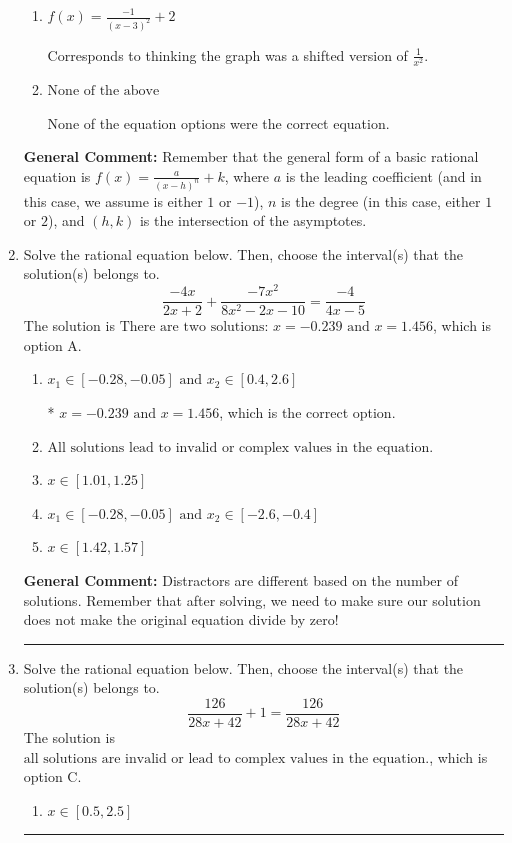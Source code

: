 \documentclass{extbook}[14pt]
\newcommand{\litem}[1]{\item #1

\rule{\textwidth}{0.4pt}}
\begin{document}
\begin{enumerate}
{\begin{enumerate}[label=\Alph*.]
Corresponds to using the general form $f(x) = \frac{a}{x-h}+k$ and the opposite leading coefficient.
\item \( f(x) = \frac{-1}{(x - 3)^2} + 2 \)

Corresponds to thinking the graph was a shifted version of $\frac{1}{x^2}$.
\item \( \text{None of the above} \)

None of the equation options were the correct equation.
\end{enumerate}

\textbf{General Comment:} Remember that the general form of a basic rational equation is $ f(x) = \frac{a}{(x-h)^n} + k$, where $a$ is the leading coefficient (and in this case, we assume is either $1$ or $-1$), $n$ is the degree (in this case, either $1$ or $2$), and $(h, k)$ is the intersection of the asymptotes.
}
\litem{
Solve the rational equation below. Then, choose the interval(s) that the solution(s) belongs to.
\[ \frac{-4x}{2x + 2} + \frac{-7x^{2}}{8x^{2} -2 x -10} = \frac{-4}{4x -5} \]The solution is \( \text{There are two solutions: } x = -0.239 \text{ and } x = 1.456 \), which is option A.\begin{enumerate}[label=\Alph*.]
\item \( x_1 \in [-0.28, -0.05] \text{ and } x_2 \in [0.4,2.6] \)

* $x = -0.239 \text{ and } x = 1.456$, which is the correct option.
\item \( \text{All solutions lead to invalid or complex values in the equation.} \)


\item \( x \in [1.01,1.25] \)


\item \( x_1 \in [-0.28, -0.05] \text{ and } x_2 \in [-2.6,-0.4] \)


\item \( x \in [1.42,1.57] \)


\end{enumerate}

\textbf{General Comment:} Distractors are different based on the number of solutions. Remember that after solving, we need to make sure our solution does not make the original equation divide by zero!
}
\litem{
Solve the rational equation below. Then, choose the interval(s) that the solution(s) belongs to.
\[ \frac{126}{28x + 42} + 1 = \frac{126}{28x + 42} \]The solution is \( \text{all solutions are invalid or lead to complex values in the equation.} \), which is option C.\begin{enumerate}[label=\Alph*.]
\item \( x \in [0.5,2.5] \)


\end{enumerate}}
\end{enumerate}
\end{document}
